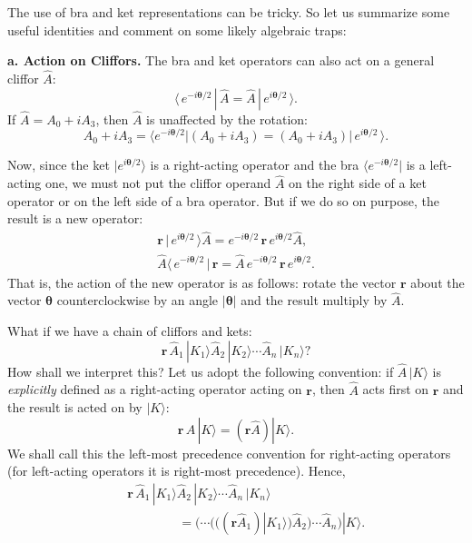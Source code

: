 \documentclass[11pt,twocolumn]{article}
\begin{document}
The use of bra and ket representations can be tricky.  So let us summarize some useful identities and comment on some likely algebraic traps:
\medskip

\textbf{a.  Action on Cliffors.}  
The bra and ket operators can also act on a general cliffor $\hat A$:
\begin{equation}
\label{eq:bra A is A ket}
\langle\, e^{-i\bm\theta/2}\,|\,\hat A=\hat A\,|\,e^{i\bm\theta/2}\,\rangle.
\end{equation}
If $\hat A=A_0+iA_3$, then $\hat A$ is unaffected by the rotation:
\begin{equation}
\label{eq:bra A_0 + iA_3 is A_0 + iA_3 ket}
A_0+iA_3=\langle e^{-i\bm\theta/2}|(A_0+iA_3)=(A_0+iA_3)|\,e^{i\bm\theta/2}\,\rangle.
\end{equation}


Now, since the ket $|e^{i\bm\theta/2}\rangle$ is a right-acting operator and the bra $\langle e^{-i\bm\theta/2}|$ is a left-acting one, we must not put the cliffor operand $\hat A$ on the right side of a ket operator or on the left side of a bra operator.  But if we do so on purpose, the result is a new operator:
\begin{eqnarray}
\label{eq:r ket A is exponential expand}
\mathbf r\,|\,e^{i\bm\theta/2}\,\rangle\hat A=e^{-i\bm\theta/2}\,\mathbf r\,e^{i\bm\theta/2}\hat A,\\
\label{eq:A bra r is exponential expand}
\hat A\langle\, e^{-i\bm\theta/2}\,|\,\mathbf r=\hat A\, e^{-i\bm\theta/2}\,\mathbf r\, e^{i\bm\theta/2}.
\end{eqnarray}
That is, the action of the new operator is as follows: rotate the vector $\mathbf r$ about the vector $\bm\theta$ counterclockwise by an angle $|\bm\theta|$ and the result multiply by $\hat A$.

What if we have a chain of cliffors and kets:
\begin{equation}
\label{eq:r A ket chain}
\mathbf r\,\hat A_1\,|K_1\rangle\hat A_2\,|K_2\rangle\cdots\hat A_n\,|K_n\rangle?
\end{equation}
How shall we interpret this?  Let us adopt the following convention: if $\hat A\,|K\rangle$ is \emph{explicitly} defined as a right-acting operator acting on $\mathbf r$, then $\hat A$ acts first on $\mathbf r$ and the result is acted on by $|K\rangle$:
\begin{equation}
\label{eq:r A ket order}
\mathbf r\,\hat A\,|K\rangle =(\mathbf r\hat A)|K \rangle.
\end{equation}
We shall call this the left-most precedence convention for right-acting operators (for left-acting operators it is right-most precedence).  Hence,
\begin{eqnarray}
\label{eq:r A ket chain order}
& &\mathbf r\,\hat A_1\,|K_1\rangle\hat A_2\,|K_2\rangle\cdots\hat A_n\,|K_n\rangle\nonumber\\
& &\qquad\qquad= (\cdots(((\mathbf r\hat A_1)|K_1\rangle)\hat A_2)\cdots\hat A_n)|K\rangle.
\end{eqnarray}
\end{document}

